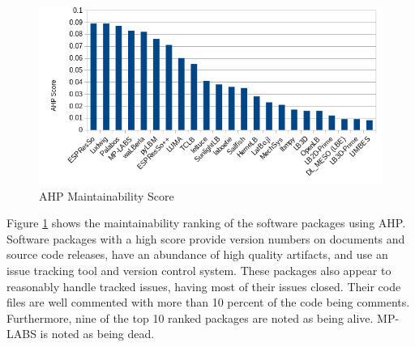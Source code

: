 \documentclass[12pt, notitlepage]{article}
\begin{document}
\begin{figure}[h!]
	\begin{center}
		\includegraphics[width=1.0\textwidth]{maintainability_chart}
		\caption{AHP Maintainability Score}
		\label{Fig_Maintainability}
	\end{center}
\end{figure}

Figure \ref{Fig_Maintainability} shows the maintainability ranking of the software packages using AHP. Software packages with a high score provide version numbers on documents and source code releases, have an abundance of high quality artifacts, and use an issue tracking tool and version control system. These packages also appear to reasonably handle tracked issues, having most of their issues closed. Their code files are well commented with more than 10 percent of the code being comments. Furthermore, nine of the top 10 ranked packages are noted as being alive. MP-LABS is noted as being dead.\\
\end{document}
